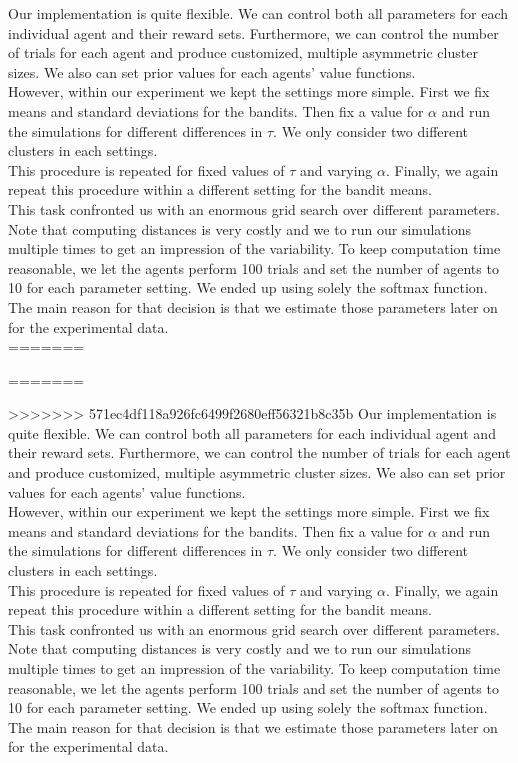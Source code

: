 \documentclass[12pt,a4paper,bibliography=totocnumbered,listof=totocnumbered]{scrartcl}
\begin{document}
Our implementation is quite flexible. We can control both all parameters for each individual agent and their reward sets. Furthermore, we can control the number of trials for each agent and produce customized, multiple asymmetric cluster sizes. We also can set prior values for each agents' value functions.\\ 
However, within our experiment we kept the settings more simple. First we fix means and standard deviations for the bandits. Then fix a value for $\alpha$ and run the simulations for different differences in $\tau$. We only consider two different clusters in each settings.\\
This procedure is repeated for fixed values of $\tau$ and varying $\alpha$. Finally, we again repeat this procedure within a different setting for the bandit means.\\
This task confronted us with an enormous grid search over different parameters. Note that computing distances is very costly and we to run our simulations multiple times to get an impression of the variability. To keep computation time reasonable, we let the agents perform 100 trials and set the number of agents to 10 for each parameter setting. We ended up using solely the softmax function. The main reason for that decision is that we estimate those parameters later on for the experimental data.\\ 

=======

=======

>>>>>>> 571ec4df118a926fc6499f2680eff56321b8c35b
Our implementation is quite flexible. We can control both all parameters for each individual agent and their reward sets. Furthermore, we can control the number of trials for each agent and produce customized, multiple asymmetric cluster sizes. We also can set prior values for each agents' value functions.\\ 
However, within our experiment we kept the settings more simple. First we fix means and standard deviations for the bandits. Then fix a value for $\alpha$ and run the simulations for different differences in $\tau$. We only consider two different clusters in each settings.\\
This procedure is repeated for fixed values of $\tau$ and varying $\alpha$. Finally, we again repeat this procedure within a different setting for the bandit means.\\
This task confronted us with an enormous grid search over different parameters. Note that computing distances is very costly and we to run our simulations multiple times to get an impression of the variability. To keep computation time reasonable, we let the agents perform 100 trials and set the number of agents to 10 for each parameter setting. We ended up using solely the softmax function. The main reason for that decision is that we estimate those parameters later on for the experimental data.\\ 
\end{document}
